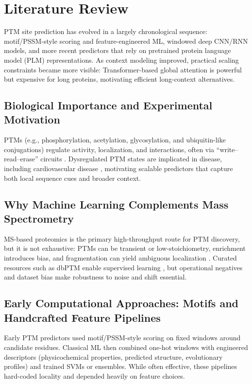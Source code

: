 \documentclass[conference]{IEEEtran}
\begin{document}
\section{Literature Review}

PTM site prediction has evolved in a largely chronological sequence: motif/PSSM-style scoring and feature-engineered ML, windowed deep CNN/RNN models, and more recent predictors that rely on pretrained protein language model (PLM) representations. As context modeling improved, practical scaling constraints became more visible: Transformer-based global attention is powerful but expensive for long proteins, motivating efficient long-context alternatives.


\subsection{Biological Importance and Experimental Motivation}
PTMs (e.g., phosphorylation, acetylation, glycosylation, and ubiquitin-like conjugations) regulate activity, localization, and interactions, often via ``write--read--erase'' circuits \cite{zhong2023ptm}. Dysregulated PTM states are implicated in disease, including cardiovascular disease \cite{cheng2023research}, motivating scalable predictors that capture both local sequence cues and broader context.

\subsection{Why Machine Learning Complements Mass Spectrometry}
MS-based proteomics is the primary high-throughput route for PTM discovery, but it is not exhaustive: PTMs can be transient or low-stoichiometry, enrichment introduces bias, and fragmentation can yield ambiguous localization \cite{messner2023mass}. Curated resources such as dbPTM enable supervised learning \cite{li2022dbptm}, but operational negatives and dataset bias make robustness to noise and shift essential.

\subsection{Early Computational Approaches: Motifs and Handcrafted Feature Pipelines}
Early PTM predictors used motif/PSSM-style scoring on fixed windows around candidate residues. Classical ML then combined one-hot windows with engineered descriptors (physicochemical properties, predicted structure, evolutionary profiles) and trained SVMs or ensembles. While often effective, these pipelines hard-coded locality and depended heavily on feature choices.
\end{document}

